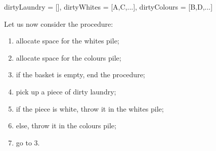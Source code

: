 \begin{code}
{ dirtyLaundry = [],
  dirtyWhites = [A,C,...], dirtyColours = [B,D,...] }
\end{code}

Let us now consider the  procedure: 

\begin{enumerate}

\item allocate space for the whites pile;

\item allocate space for the colours pile;

\item if the basket is empty, end the procedure;

\item pick up a piece of dirty laundry;

\item if the piece is white, throw it in the whites pile;

\item else, throw it in the colours pile;

\item go to 3.

\end{enumerate}
